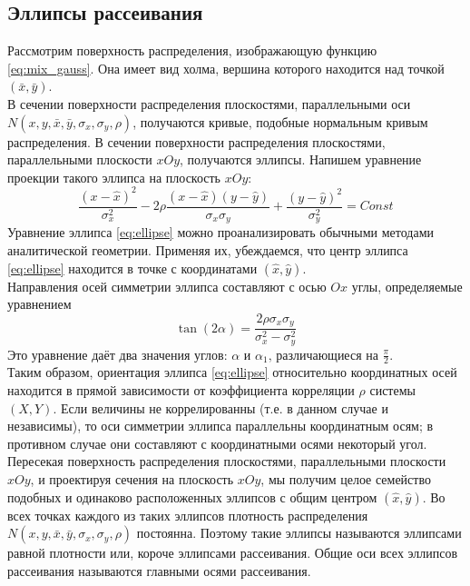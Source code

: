 \documentclass[main.tex]{subfiles}
\begin{document}
\subsection{Эллипсы рассеивания}
Рассмотрим поверхность распределения, изображающую функцию \eqref{eq:mix_gauss}. Она имеет вид холма, вершина которого находится над точкой $(\bar{x}, \bar{y})$. \\
В сечении поверхности распределения плоскостями, параллельными оси $N(x, y, \bar{x}, \bar{y}, \sigma_{x}, \sigma_{y}, \rho)$, получаются кривые, подобные нормальным кривым распределения. В сечении поверхности распределения плоскостями, параллельными плоскости $xOy$, получаются эллипсы. Напишем уравнение проекции такого эллипса на плоскость $xOy$:
\begin{equation} \label{eq:ellipse}
	\dfrac{(x - \hat{x})^2}{\sigma_{x}^2} - 2 \rho \dfrac{(x - \hat{x}) (y - \hat{y})}{\sigma_{x} \sigma_{y}} + \dfrac{(y - \hat{y})^2}{\sigma_{y}^2} = Const
\end{equation}
Уравнение эллипса \eqref{eq:ellipse} можно проанализировать обычными методами аналитической геометрии. Применяя их, убеждаемся, что центр эллипса \eqref{eq:ellipse} находится в точке с координатами $(\hat{x}, \hat{y})$. \\
Направления осей симметрии эллипса составляют с осью $Ox$ углы, определяемые уравнением
\begin{equation}
	\tan(2 \alpha) = \dfrac{2 \rho \sigma_{x} \sigma_{y}}{\sigma_{x}^2 - \sigma_{y}^2}
\end{equation}
Это уравнение даёт два значения углов: $\alpha \text{ и } \alpha_1 \text{, различающиеся на } \frac{\pi}{2}$. \\
Таким образом, ориентация эллипса \eqref{eq:ellipse} относительно координатных осей находится в прямой зависимости от коэффициента корреляции $\rho$ системы $(X, Y)$. Если величины не коррелированны (т.е. в данном случае и независимы), то оси симметрии эллипса параллельны координатным осям; в противном случае они составляют с координатными осями некоторый угол. Пересекая поверхность распределения плоскостями, параллельными плоскости $xOy$, и проектируя сечения на плоскость $xOy$, мы получим целое семейство подобных и одинаково расположенных эллипсов с общим центром $(\hat{x}, \hat{y})$. Во всех точках каждого из таких эллипсов плотность распределения $N(x, y, \bar{x}, \bar{y}, \sigma_{x}, \sigma_{y}, \rho)$ постоянна. Поэтому такие эллипсы называются эллипсами равной плотности или, короче эллипсами рассеивания. Общие оси всех эллипсов рассеивания называются главными осями рассеивания.
\end{document}
